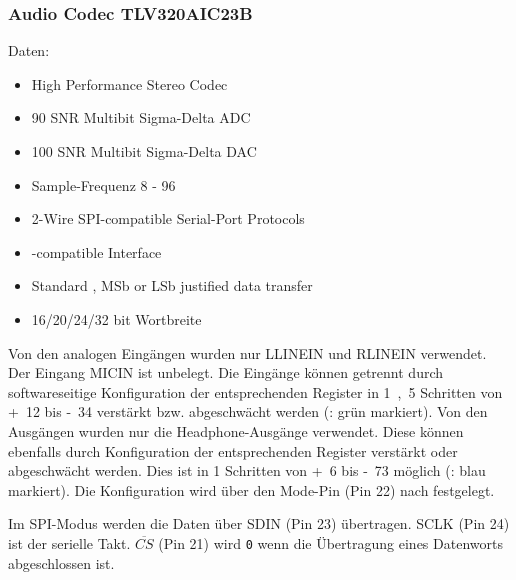 \subsubsection{Audio Codec TLV320AIC23B \cite{ti:tlv320aic23b}}
\label{sec:audio-codec}
Daten:
\begin{itemize}
    \item High Performance Stereo Codec
    \item \unit{90}{\deci\bel} \gls{SNR} Multibit Sigma-Delta \gls{ADC}
    \item \unit{100}{\deci\bel} \gls{SNR} Multibit Sigma-Delta \gls{DAC}
    \item Sample-Frequenz \unit{8}{\kilo\hertz} - \unit{96}{\kilo\hertz}
    \item 2-Wire SPI-compatible Serial-Port Protocols
    \item \IIS{}-compatible Interface
    \item Standard \IIS{}, \gls{MSb} or \gls{LSb} justified data transfer
    \item 16/20/24/32 bit Wortbreite
\end{itemize}


Von den analogen Eingängen wurden nur LLINEIN und RLINEIN verwendet. Der Eingang MICIN ist unbelegt. Die Eingänge können getrennt durch softwareseitige Konfiguration der entsprechenden Register in \unit{1,5}{\deci\bel} Schritten von \unit{+12}{\deci\bel} bis \unit{-34}{\deci\bel} verstärkt bzw. abgeschwächt werden (: grün markiert). Von den Ausgängen wurden nur die Headphone-Ausgänge verwendet. Diese können ebenfalls durch Konfiguration der entsprechenden Register verstärkt oder abgeschwächt werden. Dies ist in \unit{1}{\deci\bel} Schritten von \unit{+6}{\deci\bel} bis \unit{-73}{\deci\bel} möglich (: blau markiert). Die Konfiguration wird über den Mode-Pin (Pin 22) nach  festgelegt. 


Im SPI-Modus werden die Daten über SDIN (Pin 23) übertragen. SCLK (Pin 24) ist der serielle Takt. $\overline{CS}$ (Pin 21) wird \texttt{0} wenn die Übertragung eines Datenworts abgeschlossen ist.

